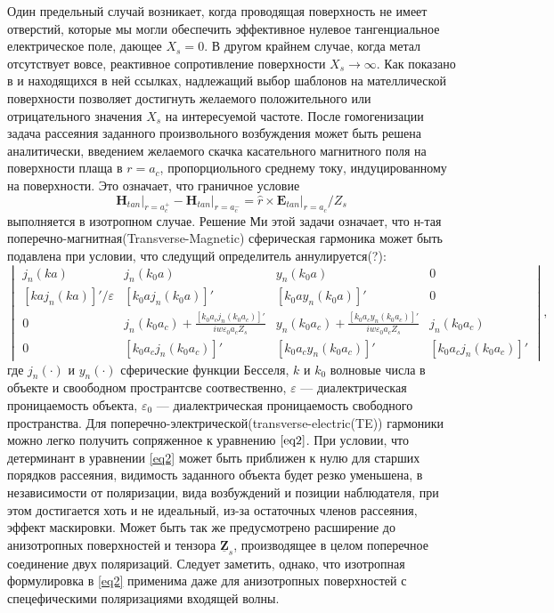 \documentclass[12pt,a4paper]{article}
\begin{document}
Один предельный случай возникает, когда проводящая поверхность не имеет отверстий, которые мы могли
обеспечить эффективное нулевое тангенциальное електрическое поле, дающее $X_s = 0$. В другом крайнем
случае, когда метал отсутствует вовсе, реактивное сопротивление поверхности $X_s \to \infty$.
Как показано в \cite{14} и находящихся в ней ссылках, надлежащий выбор шаблонов на мателлической
поверхности позволяет достигнуть желаемого положительного или отрицательного значения $X_s$ на 
интересуемой частоте. После гомогенизации задача рассеяния заданного произвольного возбуждения может
быть решена аналитически, введением желаемого скачка касательного магнитного поля на поверхности плаща
в $r=a_c$, пропорциольного среднему току, индуцированному на поверхности. Это означает, что граничное
условие 
\begin{equation}
\left.\textbf{H}_{tan}\right|_{r=a_c^+} - \left.\textbf{H}_{tan}\right|_{r=a_c^-} = 
\hat{r} \times \left.\textbf{E}_{tan}\right|_{r=a_c} / Z_s
\end{equation} 	
выполняется в изотропном случае. Решение Ми этой задачи означает, что н-тая 
поперечно-магнитная(Transverse-Magnetic) сферическая гармоника может быть подавлена при условии,
что следущий определитель аннулируется(?):
\begin{equation}\label{eq2}
\begin{vmatrix}
j_n(ka) & j_n(k_0a) & y_n(k_0a) & 0\\
[kaj_n(ka)]'/\varepsilon & [k_0aj_n(k_0a)]' & [k_0ay_n(k_0a)]' & 0\\
0 & j_n(k_0a_c)+\frac{[k_0a_cj_n(k_0a_c)]'}{iw\varepsilon_0a_cZ_s} &
y_n(k_0a_c) + \frac{[k_0a_cy_n(k_0a_c)]'}{iw\varepsilon_0a_cZ_s} & j_n(k_0a_c)\\
0 & [k_0a_cj_n(k_0a_c)]' & [k_0a_cy_n(k_0a_c)]' & [k_0a_cj_n(k_0a_c)]'
\end{vmatrix},
\end{equation}
где $j_n(\cdot)$ и $y_n(\cdot)$ сферические функции Бесселя, $k$ и $k_0$ волновые числа в объекте и
своободном пространтсве соотвественно, $\varepsilon$ --- диалектрическая проницаемость объекта,
$\varepsilon_0$ --- диалектрическая проницаемость свободного пространства.
Для поперечно-электрической(transverse-electric(TE)) гармоники можно легко 
получить сопряженное к уравнению $\ref{eq2}$. При условии, что детерминант в уравнении 
\ref{eq2} может быть приближен к нулю для старших порядков рассеяния, видимость заданного
объекта будет резко уменьшена, в независимости от поляризации, вида возбуждений и позиции
наблюдателя, при этом достигается хоть и не идеальный, из-за остаточных членов рассеяния,
эффект маскировки. Может быть так же предусмотрено расширение до анизотропных поверхностей
и тензора $\underline{\textbf{Z}}_s$, производящее в целом поперечное соединение двух 
поляризаций. Следует заметить, однако, что изотропная формулировка в \ref{eq2} применима
даже для анизотропных поверхностей с спецефическими поляризациями входящей волны.
\end{document}
